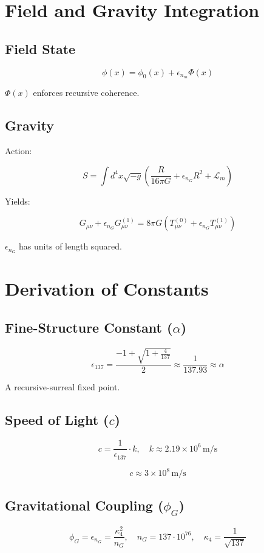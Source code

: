 \documentclass[12pt]{article}
\begin{document}
\section{Field and Gravity Integration}

\subsection{Field State}
\[
\phi(x) = \phi_0(x) + \epsilon_{n_m} \Phi(x)
\]

\(\Phi(x)\) enforces recursive coherence.

\subsection{Gravity}
Action:

\[
S = \int d^4x \sqrt{-g} \left( \frac{R}{16\pi G} + \epsilon_{n_G} R^2 + \mathcal{L}_m \right)
\]

Yields:

\[
G_{\mu\nu} + \epsilon_{n_G} G_{\mu\nu}^{(1)} = 8\pi G (T_{\mu\nu}^{(0)} + \epsilon_{n_G} T_{\mu\nu}^{(1)})
\]

\(\epsilon_{n_G}\) has units of length squared.

\section{Derivation of Constants}

\subsection{Fine-Structure Constant (\(\alpha\))}
\[
\epsilon_{137} = \frac{-1 + \sqrt{1 + \frac{4}{137}}}{2} \approx \frac{1}{137.93} \approx \alpha
\]

A recursive-surreal fixed point.

\subsection{Speed of Light (\(c\))}
\[
c = \frac{1}{\epsilon_{137}} \cdot k, \quad k \approx 2.19 \times 10^6 \, \text{m/s}
\]

\[
c \approx 3 \times 10^8 \, \text{m/s}
\]

\subsection{Gravitational Coupling (\(\phi_G\))}
\[
\phi_G = \epsilon_{n_G} = \frac{\kappa_4^2}{n_G}, \quad n_G = 137 \cdot 10^{76}, \quad \kappa_4 = \frac{1}{\sqrt{137}}
\]
\end{document}
